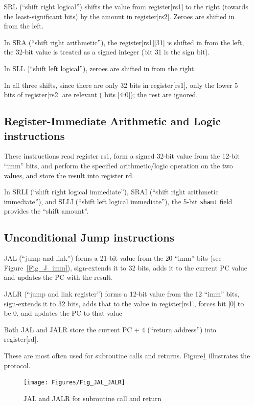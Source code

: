 SRL (``shift right logical'') shifts the value from register[rs1] to
the right (towards the least-significant bits) by the amount in
register[rs2].  Zeroes are shifted in from the left.

In SRA (``shift right arithmetic''), the register[rs1][31] is shifted
in from the left, {\ie} the 32-bit value is treated as a signed
integer (bit 31 is the sign bit).

In SLL (``shift left logical''), zeroes are shifted in from the right.

In all three shifts, since there are only 32 bits in register[rs1],
only the lower 5 bits of register[rs2] are relevant ({\ie} bits
[4:0]); the rest are ignored.


\subsection{Register-Immediate Arithmetic and Logic instructions}

These instructions read register rs1, form a signed 32-bit value from
the 12-bit ``imm'' bits, and perform the specified arithmetic/logic
operation on the two values, and store the result into register rd.

In SRLI (``shift right logical immediate''), SRAI (``shift right
arithmetic immediate''), and SLLI (``shift left logical immediate''),
the 5-bit \verb|shamt| field provides the ``shift amount''.


\subsection{Unconditional Jump instructions}

JAL (``jump and link'') forms a 21-bit value from the 20 ``imm'' bits
(see Figure~\ref{Fig_J_imm}), sign-extends it to 32 bits, adds it to
the current PC value and updates the PC with the result.

JALR (``jump and link register'') forms a 12-bit value from the 12
``imm'' bits, sign-extends it to 32 bits, adds that to the value in
register[rs1], forces bit [0] to be 0, and updates the PC to that
value

Both JAL and JALR store the current PC + 4 (``return address'') into
register[rd].

These are most often used for subroutine calls and returns.
Figure\ref{Fig_JAL_JALR} illustrates the protocol.
\begin{figure}[htbp]
  \centerline{\texttt{[image: Figures/Fig\_JAL\_JALR]}}
  \caption{\label{Fig_JAL_JALR} JAL and JALR for subroutine call and return}
\end{figure}

